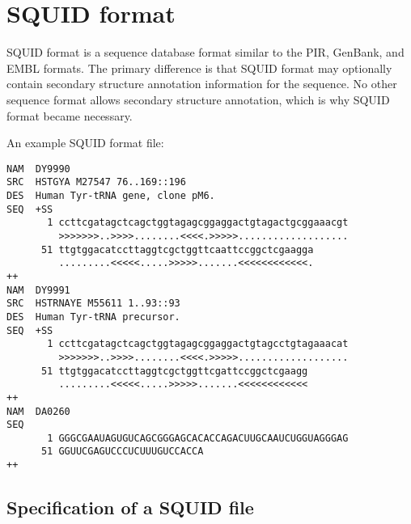 \newpage
\section {SQUID format}

SQUID format is a sequence database format similar to the PIR,
GenBank, and EMBL formats. The primary difference is that SQUID format
may optionally contain secondary structure annotation information for
the sequence. No other sequence format allows secondary structure
annotation, which is why SQUID format became necessary.

An example SQUID format file:

\begin{verbatim}
NAM  DY9990
SRC  HSTGYA M27547 76..169::196
DES  Human Tyr-tRNA gene, clone pM6.
SEQ  +SS
       1 ccttcgatagctcagctggtagagcggaggactgtagactgcggaaacgt
         >>>>>>>..>>>>........<<<<.>>>>>...................
      51 ttgtggacatccttaggtcgctggttcaattccggctcgaagga
         .........<<<<<.....>>>>>.......<<<<<<<<<<<<.
++
NAM  DY9991
SRC  HSTRNAYE M55611 1..93::93
DES  Human Tyr-tRNA precursor.
SEQ  +SS
       1 ccttcgatagctcagctggtagagcggaggactgtagcctgtagaaacat
         >>>>>>>..>>>>........<<<<.>>>>>...................
      51 ttgtggacatccttaggtcgctggttcgattccggctcgaagg
         .........<<<<<.....>>>>>.......<<<<<<<<<<<<
++
NAM  DA0260
SEQ
       1 GGGCGAAUAGUGUCAGCGGGAGCACACCAGACUUGCAAUCUGGUAGGGAG
      51 GGUUCGAGUCCCUCUUUGUCCACCA
++
\end{verbatim}


\subsection {Specification of a SQUID file}

